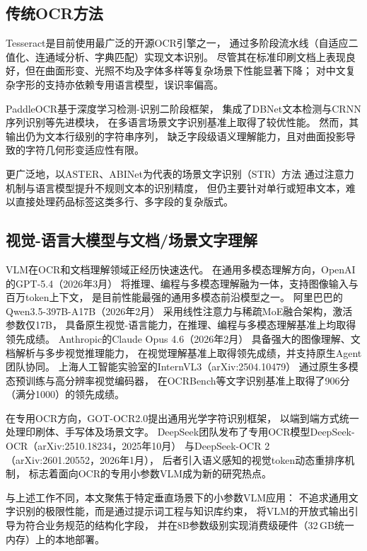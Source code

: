 \documentclass[12pt, a4paper]{article}
\begin{document}
\subsection{传统OCR方法}

Tesseract\cite{ref:tesseract}是目前使用最广泛的开源OCR引擎之一，
通过多阶段流水线（自适应二值化、连通域分析、字典匹配）实现文本识别。
尽管其在标准印刷文档上表现良好，但在曲面形变、光照不均及字体多样等复杂场景下性能显著下降；
对中文复杂字形的支持亦依赖专用语言模型，误识率偏高。

PaddleOCR\cite{ref:paddleocr}基于深度学习检测-识别二阶段框架，
集成了DBNet\cite{ref:dbnet}文本检测与CRNN\cite{ref:crnn}序列识别等先进模块，
在多语言场景文字识别基准上取得了较优性能。
然而，其输出仍为文本行级别的字符串序列，
缺乏字段级语义理解能力，且对曲面投影导致的字符几何形变适应性有限。

更广泛地，以ASTER\cite{ref:aster}、ABINet\cite{ref:abinet}为代表的场景文字识别（STR）方法
通过注意力机制与语言模型提升不规则文本的识别精度，
但仍主要针对单行或短串文本，难以直接处理药品标签这类多行、多字段的复杂版式。

\subsection{视觉-语言大模型与文档/场景文字理解}

VLM在OCR和文档理解领域正经历快速迭代。
在通用多模态理解方向，OpenAI的GPT-5.4\cite{ref:gpt54}（2026年3月）
将推理、编程与多模态理解融为一体，支持图像输入与百万token上下文，
是目前性能最强的通用多模态前沿模型之一。
阿里巴巴的Qwen3.5-397B-A17B\cite{ref:qwen35}（2026年2月）
采用线性注意力与稀疏MoE融合架构，激活参数仅17B，
具备原生视觉-语言能力，在推理、编程与多模态理解基准上均取得领先成绩。
Anthropic的Claude Opus 4.6\cite{ref:claude46}（2026年2月）
具备强大的图像理解、文档解析与多步视觉推理能力，
在视觉理解基准上取得领先成绩，并支持原生Agent团队协同。
上海人工智能实验室的InternVL3\cite{ref:internvl3}（arXiv:2504.10479）
通过原生多模态预训练与高分辨率视觉编码器，
在OCRBench等文字识别基准上取得了906分（满分1000）的领先成绩。

在专用OCR方向，GOT-OCR2.0\cite{ref:gotocr}提出通用光学字符识别框架，
以端到端方式统一处理印刷体、手写体及场景文字。
DeepSeek团队发布了专用OCR模型DeepSeek-OCR\cite{ref:deepseekocr}（arXiv:2510.18234，2025年10月）
与DeepSeek-OCR 2\cite{ref:deepseekocr2}（arXiv:2601.20552，2026年1月），
后者引入语义感知的视觉token动态重排序机制，
标志着面向OCR的专用小参数VLM成为新的研究热点。

与上述工作不同，本文聚焦于特定垂直场景下的小参数VLM应用：
不追求通用文字识别的极限性能，而是通过提示词工程与知识库约束，
将VLM的开放式输出引导为符合业务规范的结构化字段，
并在8B参数级别实现消费级硬件（32\,GB统一内存）上的本地部署。
\end{document}
